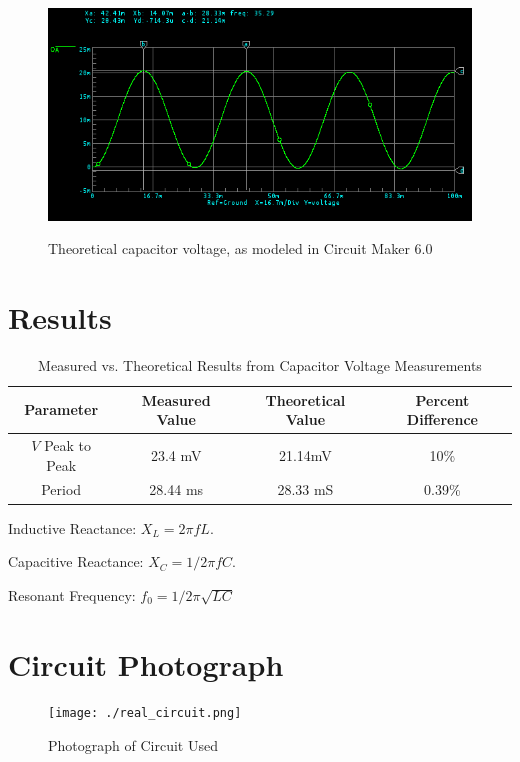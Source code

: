 \documentclass[twocolumn,english]{IEEEtran}
\theoremstyle{plain}
\theoremstyle{plain}
\begin{document}
  \begin{figure}[h!]
  \begin{centering}
  \begin{center}
  \includegraphics[width=\linewidth]{./waveform.png}
  \label{fig:theory_wave}
  \caption{Theoretical capacitor voltage, as modeled in Circuit Maker 6.0}
  \end{center}
  \par\end{centering}
  \end{figure}

\section{Results}
\begin{table}[h!]
\centering{}
\caption{Measured vs. Theoretical Results from Capacitor Voltage Measurements}
\label{tb:meas_err}
\begin{tabular}{|c|c|c|c|}
\hline
\textbf{Parameter}	&\textbf{Measured Value}		&\textbf{Theoretical Value}	&\textbf{Percent Difference}	\\ \hline
$V$ Peak to Peak	&23.4 mV				&21.14mV 			&10\%				\\ \hline
Period			&28.44 ms				&28.33 mS  			&0.39\% 			\\ \hline
\end{tabular}
\end{table}

Inductive Reactance: $X_L = 2\pi f L$.

Capacitive Reactance: $X_C = 1/2\pi f C$.

Resonant Frequency: $f_0 = 1/2\pi\sqrt{LC}$

\appendices{}

\section{Circuit Photograph}\label{append:deriv}

\begin{figure}[h!]
  \begin{centering}
  \begin{center}
  \texttt{[image: ./real\_circuit.png]}
  \label{fig:real_circuit}
  \caption{Photograph of Circuit Used}
  \end{center}
  \par\end{centering}
  \end{figure}

%
%
\end{document}
